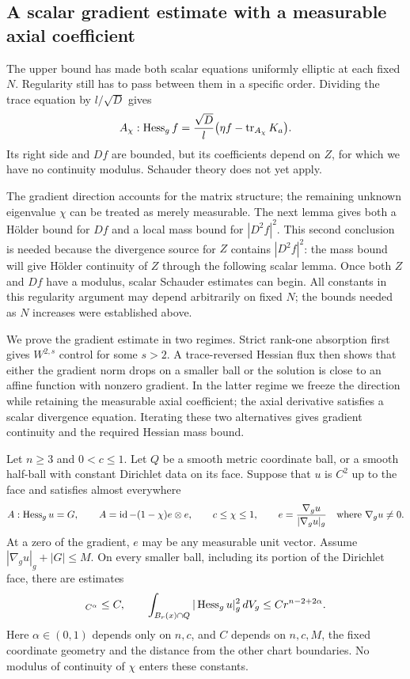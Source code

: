 \subsection{A scalar gradient estimate with a measurable axial coefficient}

The upper bound has made both scalar equations uniformly elliptic
at each fixed $N$.  Regularity still has to pass between them in a
specific order.  Dividing the trace equation by $l/\sqrt D$ gives
\[
 A_\chi:\operatorname{Hess}_g f
   =\frac{\sqrt D}{l}\bigl(\eta f-\operatorname{tr}_{A_\chi}K_a\bigr).
\]
Its right side and $Df$ are bounded, but its coefficients depend on
$Z$, for which we have no continuity modulus.  Schauder theory does
not yet apply.

The gradient direction accounts for the matrix structure; the remaining
unknown eigenvalue $\chi$ can be treated as merely measurable.  The next
lemma gives both a H\"older bound for $Df$ and a local mass bound for
$|D^2f|^2$.  This second conclusion is needed because the divergence
source for $Z$ contains $|D^2f|^2$: the mass bound will give H\"older
continuity of $Z$ through the following scalar lemma.  Once both $Z$
and $Df$ have a modulus, scalar Schauder estimates can begin.  All
constants in this regularity argument may depend arbitrarily on fixed
$N$; the bounds needed as $N$ increases were established above.

We prove the gradient estimate in two regimes.  Strict rank-one
absorption first gives $W^{2,s}$ control for some $s>2$.  A
trace-reversed Hessian flux then shows that either the gradient norm
drops on a smaller ball or the solution is close to an affine function
with nonzero gradient.  In the latter regime we freeze the direction
while retaining the measurable axial coefficient; the axial derivative
satisfies a scalar divergence equation.  Iterating these two alternatives
gives gradient continuity and the required Hessian mass bound.

\begin{lemma}
\label{lem:elliptic:gradient}
Let $n\geq3$ and $0<c\leq1$.  Let $Q$ be a smooth metric coordinate ball, or a
smooth half-ball with constant Dirichlet data on its face.  Suppose that
$u$ is $C^2$ up to the face and satisfies almost everywhere
\begin{equation}
 A:\operatorname{Hess}_g u=G,\qquad
 A=\operatorname{id}-(1-\chi)e\otimes e,\qquad
 c\leq\chi\leq1,\qquad
 e=\frac{\nabla_g u}{|\nabla_g u|_g}
 \quad\text{where }\nabla_g u\ne0.
 \label{eq:elliptic:rankone-equation}
\end{equation}
At a zero of the gradient, $e$ may be any measurable unit vector.  Assume
$|\nabla_g u|_g+|G|\leq M$.  On every smaller ball, including its portion
of the Dirichlet face, there are estimates
\begin{equation}
 [Du]_{C^\alpha}\leq C,\qquad
 \int_{B_r(x)\cap Q}|\Hess_g u|_g^2\,dV_g
       \leq C r^{n-2+2\alpha}.
 \label{eq:elliptic:rankone-conclusion}
\end{equation}
Here $\alpha\in(0,1)$ depends only on $n,c$, and $C$ depends on $n,c,M$,
the fixed coordinate geometry and the distance from the other chart
boundaries.  No modulus of continuity of $\chi$ enters these constants.
\end{lemma}

